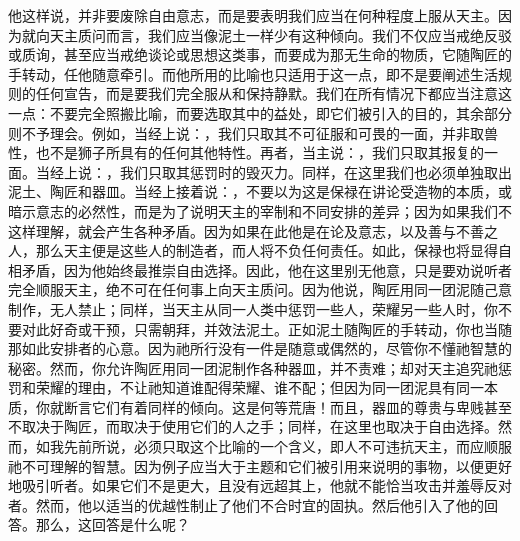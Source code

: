 他这样说，并非要废除自由意志，而是要表明我们应当在何种程度上服从天主。因为就向天主质问而言，我们应当像泥土一样少有这种倾向。我们不仅应当戒绝反驳或质询，甚至应当戒绝谈论或思想这类事，而要成为那无生命的物质，它随陶匠的手转动，任他随意牵引。而他所用的比喻也只适用于这一点，即不是要阐述生活规则的任何宣告，而是要我们完全服从和保持静默。我们在所有情况下都应当注意这一点：不要完全照搬比喻，而要选取其中的益处，即它们被引入的目的，其余部分则不予理会。例如，当经上说：，我们只取其不可征服和可畏的一面，并非取兽性，也不是狮子所具有的任何其他特性。再者，当主说：，我们只取其报复的一面。当经上说：，我们只取其惩罚时的毁灭力。同样，在这里我们也必须单独取出泥土、陶匠和器皿。当经上接着说：，不要以为这是保禄在讲论受造物的本质，或暗示意志的必然性，而是为了说明天主的宰制和不同安排的差异；因为如果我们不这样理解，就会产生各种矛盾。因为如果在此他是在论及意志，以及善与不善之人，那么天主便是这些人的制造者，而人将不负任何责任。如此，保禄也将显得自相矛盾，因为他始终最推崇自由选择。因此，他在这里别无他意，只是要劝说听者完全顺服天主，绝不可在任何事上向天主质问。因为他说，陶匠用同一团泥随己意制作，无人禁止；同样，当天主从同一人类中惩罚一些人，荣耀另一些人时，你不要对此好奇或干预，只需朝拜，并效法泥土。正如泥土随陶匠的手转动，你也当随那如此安排者的心意。因为祂所行没有一件是随意或偶然的，尽管你不懂祂智慧的秘密。然而，你允许陶匠用同一团泥制作各种器皿，并不责难；却对天主追究祂惩罚和荣耀的理由，不让祂知道谁配得荣耀、谁不配；但因为同一团泥具有同一本质，你就断言它们有着同样的倾向。这是何等荒唐！而且，器皿的尊贵与卑贱甚至不取决于陶匠，而取决于使用它们的人之手；同样，在这里也取决于自由选择。然而，如我先前所说，必须只取这个比喻的一个含义，即人不可违抗天主，而应顺服祂不可理解的智慧。因为例子应当大于主题和它们被引用来说明的事物，以便更好地吸引听者。如果它们不是更大，且没有远超其上，他就不能恰当攻击并羞辱反对者。然而，他以适当的优越性制止了他们不合时宜的固执。然后他引入了他的回答。那么，这回答是什么呢？\par

\par

